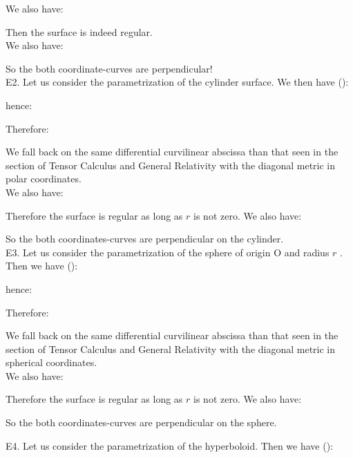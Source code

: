 {\begin{tcolorbox}[colframe=black,colback=white,sharp corners]
	We also have:
	
	Then the surface is indeed regular. \\

	We also have:
	
	So the both coordinate-curves are perpendicular!\\
	
	E2. Let us consider the parametrization of the cylinder surface. We then have ():
	
	hence:
	
	\end{tcolorbox}
	
	\begin{tcolorbox}[colframe=black,colback=white,sharp corners]
	Therefore:
	
	We fall back on the same differential curvilinear abscissa than that seen in the section of Tensor Calculus and General Relativity with the diagonal metric in polar coordinates.\\
	
	We also have:
	
	Therefore the surface is regular as long as $r$ is not zero. We also have:
	
	So the both coordinates-curves are perpendicular on the cylinder.\\
	
	E3. Let us consider the parametrization of the sphere of origin O and radius $r$ \label{metric two sphere}. Then we have ():
	
	hence:
	
	Therefore:
	
	We fall back on the same differential curvilinear abscissa than that seen in the section of Tensor Calculus and General Relativity with the diagonal metric in spherical coordinates.\\
	
	We also have:
	
	Therefore the surface is regular as long as $r$ is not zero. We also have:
	
	So the both coordinates-curves are perpendicular on the sphere.\\
	\end{tcolorbox}
	
	\begin{tcolorbox}[colframe=black,colback=white,sharp corners]
	E4. Let us consider the parametrization of the hyperboloid. Then we have ():
	

\end{tcolorbox}}
